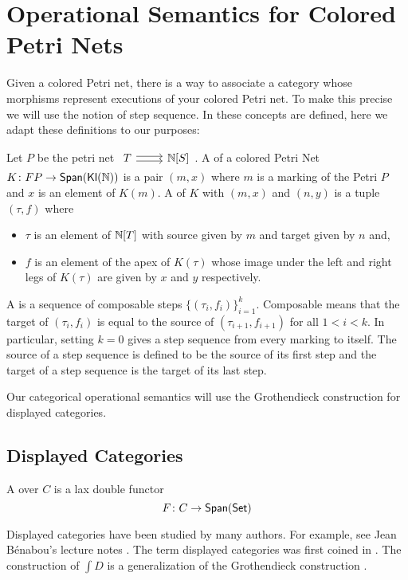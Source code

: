\section{Operational Semantics for Colored Petri Nets}\label{sec:unfolding}
Given a colored Petri net, there is a way to associate a category whose morphisms represent executions of your colored Petri net. To make this precise we will use the notion of step sequence. In \cite{lakosabstraction} these concepts are defined, here we adapt these definitions to our purposes:
\begin{defn}
Let $P$ be the petri net $\begin{tikzcd}T \ar[r,shift left=.5ex] \ar[r,shift right=.5ex] & \N[S] \end{tikzcd}$.
A  of a colored Petri Net $K \colon FP \to \mathsf{Span}(\mathsf{\mathsf{Kl}(\mathbb{N}) })$ is a pair $(m,x)$ where $m$ is a marking of the Petri $P$ and $x$ is an element of $K(m)$. A  of $K$ with  $(m,x)$ and  $(n,y)$ is a tuple $(\tau,f)$ where
\begin{itemize}
    \item $\tau$ is an element of $\mathbb{N}[T]$ with source given by $m$ and target given by $n$ and,
    \item $f$ is an element of the apex of $K(\tau)$ whose image under the left and right legs of $K(\tau)$ are given by $x$ and $y$ respectively.
\end{itemize}
A  is a sequence of composable steps $\{(\tau_i,f_i)\}_{i=1}^{k}$. Composable means that the target of $(\tau_i,f_i)$ is equal to the source of $(\tau_{i+1},f_{i+1})$ for all $1<i<k$. In particular, setting $k=0$ gives a step sequence from every marking to itself. The source of a step sequence is defined to be the source of its first step and the target of a step sequence is the target of its last step.
\end{defn}\noindent Our categorical operational semantics will use the Grothendieck construction for displayed categories. 

\subsection{Displayed Categories}

\begin{defn}
    A  over $C$ is a lax double functor 
    \[ F \colon C \to \mathsf{Span}(\mathsf{Set})\]
\end{defn}
Displayed categories have been studied by many authors. For example, see Jean B\'enabou's lecture notes \cite{benabounotes}. The term displayed categories was first coined in  \cite{displayed}. %
The construction of $\int D$ is a generalization of the Grothendieck construction \cite{SGAI}.

